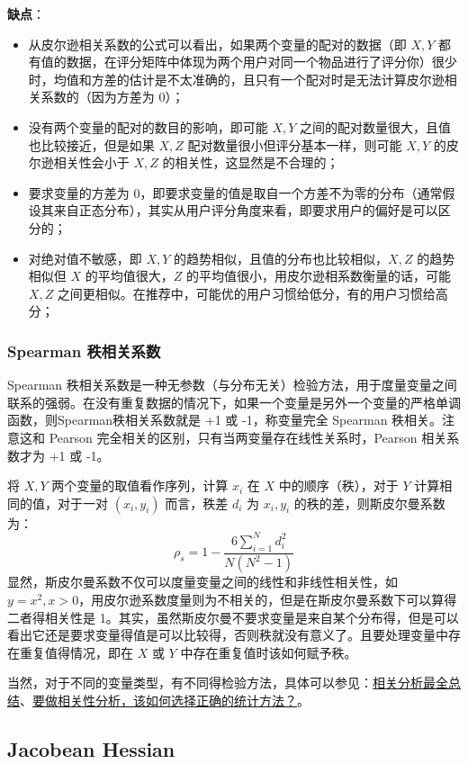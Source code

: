 \textbf{缺点}：
\begin{itemize}
	\item 从皮尔逊相关系数的公式可以看出，如果两个变量的配对的数据（即 $X, Y$ 都有值的数据，在评分矩阵中体现为两个用户对同一个物品进行了评分你）很少时，均值和方差的估计是不太准确的，且只有一个配对时是无法计算皮尔逊相关系数的（因为方差为 0）；
	\item 没有两个变量的配对的数目的影响，即可能 $X, Y$ 之间的配对数量很大，且值也比较接近，但是如果 $X, Z$ 配对数量很小但评分基本一样，则可能 $X, Y$ 的皮尔逊相关性会小于 $X, Z$ 的相关性，这显然是不合理的；
	\item 要求变量的方差为 0，即要求变量的值是取自一个方差不为零的分布（通常假设其来自正态分布），其实从用户评分角度来看，即要求用户的偏好是可以区分的；
	\item 对绝对值不敏感，即 $X, Y$ 的趋势相似，且值的分布也比较相似，$X, Z$ 的趋势相似但 $X$ 的平均值很大，$Z$ 的平均值很小，用皮尔逊相系数衡量的话，可能 $X, Z$ 之间更相似。在推荐中，可能优的用户习惯给低分，有的用户习惯给高分； 
\end{itemize}

\subsubsection{Spearman 秩相关系数}
Spearman 秩相关系数是一种无参数（与分布无关）检验方法，用于度量变量之间联系的强弱。在没有重复数据的情况下，如果一个变量是另外一个变量的严格单调函数，则Spearman秩相关系数就是 +1 或 -1，称变量完全 Spearman 秩相关。注意这和 Pearson 完全相关的区别，只有当两变量存在线性关系时，Pearson 相关系数才为 +1 或 -1。

将 $X, Y$ 两个变量的取值看作序列，计算 $x_i$ 在 $X$ 中的顺序（秩），对于 $Y$ 计算相同的值，对于一对 $(x_i, y_i)$ 而言，秩差 $d_i$ 为 $x_i, y_i$ 的秩的差，则斯皮尔曼系数为：
$$
\rho_{s} = 1 - \frac{6 \sum_{i=1}^N d_i^2}{N(N^2 - 1)}
$$
显然，斯皮尔曼系数不仅可以度量变量之间的线性和非线性相关性，如 $y = x^2, x > 0$，用皮尔逊系数度量则为不相关的，但是在斯皮尔曼系数下可以算得二者得相关性是 1。其实，虽然斯皮尔曼不要求变量是来自某个分布得，但是可以看出它还是要求变量得值是可以比较得，否则秩就没有意义了。且要处理变量中存在重复值得情况，即在 $X$ 或 $Y$ 中存在重复值时该如何赋予秩。

当然，对于不同的变量类型，有不同得检验方法，具体可以参见：\href{https://zhuanlan.zhihu.com/p/396580986}{相关分析最全总结}、\href{https://zhuanlan.zhihu.com/p/94070722}{要做相关性分析，该如何选择正确的统计方法？}。

\subsection{Jacobean Hessian}